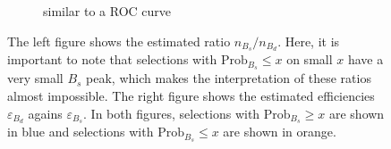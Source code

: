 \begin{figure}
\begin{subfigure}{0.5\textwidth}
        \caption{similar to a ROC curve}
        \label{fig:data_roc}
    \end{subfigure}%
    \caption{The left figure shows the estimated ratio $n_{B_s}/n_{B_d}$. Here, it is important to note that selections with $\text{Prob}_{B_s} \leq x$ on small $x$ have a very small $B_s$ peak, which makes the interpretation of these ratios almost impossible. The right figure shows the estimated efficiencies $\varepsilon_{B_d}$ agains $\varepsilon_{B_s}$. In both figures, selections with $\text{Prob}_{B_s} \geq x$ are shown in blue and selections with $\text{Prob}_{B_s} \leq x$ are shown in orange.}
\end{figure}


